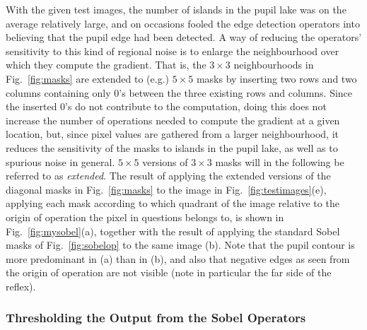 With the given test images, the number of islands in the pupil lake
was on the average relatively large, and on occasions fooled the edge
detection operators into believing that the pupil edge had been
detected.  A way of reducing the operators' sensitivity to this kind
of regional noise is to enlarge the neighbourhood over which they
compute the gradient.  That is, the $3\times 3$ neighbourhoods in
Fig.~\ref{fig:masks} are extended to (e.g.) $5\times 5$ masks by
inserting two rows and two columns containing only 0's between the
three existing rows and columns.  Since the inserted 0's do not
contribute to the computation, doing this does not increase the number
of operations needed to compute the gradient at a given location, but,
since pixel values are gathered from a larger neighbourhood, it
reduces the sensitivity of the masks to islands in the pupil lake, as
well as to spurious noise in general.  $5\times 5$ versions of
$3\times 3$ masks will in the following be referred to as {\em
  extended\/}.  The result of applying the extended versions of the
diagonal masks in Fig.~\ref{fig:masks} to the image in
Fig.~\ref{fig:testimages}(e), applying each mask according to which
quadrant of the image relative to the origin of operation the pixel in
questions belongs to, is shown in Fig.~\ref{fig:mysobel}(a), together
with the result of applying the standard Sobel masks of
Fig.~\ref{fig:sobelop} to the same image (b).  Note that the pupil
contour is more predominant in (a) than in (b), and also that negative
edges as seen from the origin of operation are not visible (note in
particular the far side of the reflex).

\subsubsection{Thresholding the Output from the Sobel Operators}


